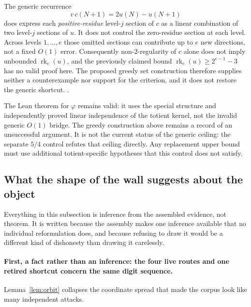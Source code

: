 The generic recurrence
\[
  v\,c(N+1)=2u(N)-u(N+1)
\]
does express each \emph{positive-residue} level-$j$ section of $c$ as a
linear combination of two level-$j$ sections of $u$.  It does not control the
zero-residue section at each level.  Across levels $1,\ldots,e$ those omitted
sections can contribute up to $e$ new directions, not a fixed $O(1)$ error.
Consequently non-$2$-regularity of $c$ alone does not imply unbounded
$\operatorname{rk}_e(u)$, and the previously claimed bound
$\operatorname{rk}_e(u)\ge2^{e-1}-3$ has no valid proof here.  The proposed
greedy set construction therefore supplies neither a counterexample nor
support for the criterion, and it does not restore the generic shortcut.
 
.

The Lean theorem for $\varphi$ remains valid: it uses the special structure
and independently proved linear independence of the totient kernel, not the
invalid generic $O(1)$ bridge. The greedy construction above remains a
record of an unsuccessful argument. It is not the current status of the
generic ceiling: the separate $5/4$ control refutes that ceiling directly.
Any replacement upper bound must use additional totient-specific hypotheses
that this control does not satisfy.

\subsection{What the shape of the wall suggests about the object}\label{sub:shape}

Everything in this subsection is inference from the assembled evidence, not
theorem. It is written because the assembly makes one inference available
that no individual reformulation does, and because refusing to draw it would
be a different kind of dishonesty than drawing it carelessly.

\paragraph{First, a fact rather than an inference: the four live routes and
one retired shortcut concern the same digit sequence.}
Lemma~\ref{lem:orbit} collapses the coordinate spread that made the corpus
look like many independent attacks.

